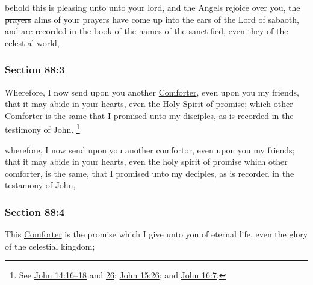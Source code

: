 		\begin{framed}
		\scriptsize
			\begin{compactdesc}
				\item[JSP] behold this is pleasing unto unto your lord, and the Angels rejoice over you, the \sout{prayers} alms of your prayers have come up into the ears of the Lord of sabaoth, and are recorded in the book of the names of the sanctified, even they of the celestial world,
			\end{compactdesc}
		\end{framed}

	\subsubsection{Section 88:3} %
		\label{DC88-3}

		Wherefore, I now send upon you another \hyperref[COMFORTER]{Comforter}, even upon you my friends, that it may abide in your hearts, even the \hyperref[HSOP]{Holy Spirit of promise}; which other \hyperref[COMFORTER]{Comforter} is the same that I promised unto my disciples, as is recorded in the testimony of John.%
		\footnote{%
			See \hyperref[JOHN-14-16]{John 14:16--18} and \hyperref[JOHN-14-26]{26}; \hyperref[JOHN-15-26]{John 15:26}; and \hyperref[JOHN-16-7]{John 16:7}.
			} 

		\begin{framed}
		\scriptsize
			\begin{compactdesc}
				\item[JSP] wherefore, I now send upon you another comfortor, even upon you my friends; that it may abide in your hearts, even the holy spirit of promise which other comforter, is the same, that I promised unto my deciples, as is recorded in the testamony of John,
			\end{compactdesc}
		\end{framed}

	\subsubsection{Section 88:4} %
		\label{DC88-4}

		This \hyperref[COMFORTER]{Comforter} is the promise which I give unto you of eternal life, even the glory of the celestial kingdom;

